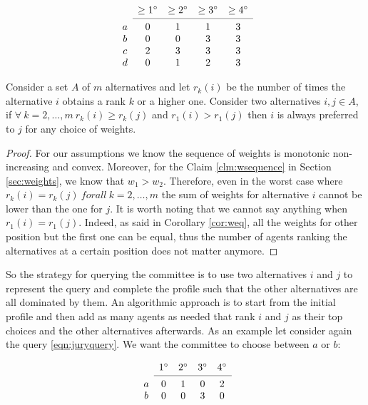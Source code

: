 \[
\begin{array}{ccccc}
& \geq 1^\circ
& \geq 2^\circ
& \geq 3^\circ
& \geq 4^\circ \\
\cmidrule{2-5}
a 
& 0
& 1
& 1
& 3 \\
b
& 0
& 0
& 3
& 3 \\
c
& 2
& 3
& 3
& 3 \\
d
& 0
& 1
& 2
& 3 \\
\end{array}
\]


\begin{claim}
	Consider a set $A$ of $m$ alternatives and let $r_k(i)$ be the number of times the alternative $i$ obtains a rank $k$ or a higher one. Consider two alternatives $ i,j \in A$, if $\forall \ k=2, \dots,m \ r_k(i)\geq r_k(j)$ and $r_1(i) > r_1(j)$ then $i$ is always preferred to $j$ for any choice of weights.
\end{claim}

\begin{proof}
	For our assumptions we know the sequence of weights is monotonic non-increasing and convex. Moreover, for the Claim \ref{clm:wsequence} in Section \ref{sec:weights}, we know that $w_1 > w_2$. Therefore, even in the worst case where $r_k(i) = r_k(j) \ forall \ k=2, \dots,m$ the sum of weights for alternative $i$ cannot be lower than the one for $j$. It is worth noting that we cannot say anything when $r_1(i) = r_1(j)$. Indeed, as said in Corollary \ref{cor:weq}, all the weights for other position but the first one can be equal, thus the number of agents ranking the alternatives at a certain position does not matter anymore.	
\end{proof}

So the strategy for querying the committee is to use two alternatives $i$ and $j$ to represent the query and complete the profile such that the other alternatives are all dominated by them. An algorithmic approach is to start from the initial profile and then add as many agents as needed that rank $i$ and $j$ as their top choices and the other alternatives afterwards. As an example let consider again the query \ref*{eqn:juryquery}. We want the committee to choose between $a$ or $b$:

\[
\begin{array}{ccccc}
& 1^\circ
& 2^\circ
& 3^\circ
& 4^\circ \\
\cmidrule{2-5}
a 
& 0
& 1
& 0
& 2 \\
b
& 0
& 0
& 3
& 0 \\
\end{array}
\]


